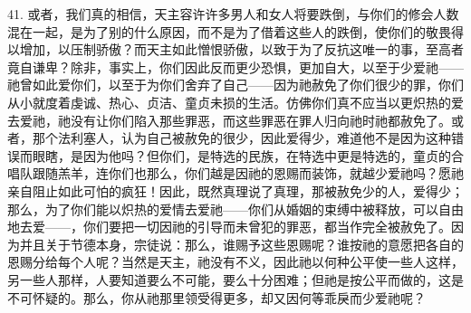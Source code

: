 41. 或者，我们真的相信，天主容许许多男人和女人将要跌倒，与你们的修会人数混在一起，是为了别的什么原因，而不是为了借着这些人的跌倒，使你们的敬畏得以增加，以压制骄傲？而天主如此憎恨骄傲，以致于为了反抗这唯一的事，至高者竟自谦卑？除非，事实上，你们因此反而更少恐惧，更加自大，以至于少爱祂——祂曾如此爱你们，以至于为你们舍弃了自己——因为祂赦免了你们很少的罪，你们从小就度着虔诚、热心、贞洁、童贞未损的生活。仿佛你们真不应当以更炽热的爱去爱祂，祂没有让你们陷入那些罪恶，而这些罪恶在罪人归向祂时祂都赦免了。或者，那个法利塞人，认为自己被赦免的很少，因此爱得少，难道他不是因为这种错误而眼瞎，是因为他吗？但你们，是特选的民族，在特选中更是特选的，童贞的合唱队跟随羔羊，连你们也那么，你们越是因祂的恩赐而装饰，就越少爱祂吗？愿祂亲自阻止如此可怕的疯狂！因此，既然真理说了真理，那被赦免少的人，爱得少；那么，为了你们能以炽热的爱情去爱祂——你们从婚姻的束缚中被释放，可以自由地去爱——，你们要把一切因祂的引导而未曾犯的罪恶，都当作完全被赦免了。因为并且关于节德本身，宗徒说：那么，谁赐予这些恩赐呢？谁按祂的意愿把各自的恩赐分给每个人呢？当然是天主，祂没有不义，因此祂以何种公平使一些人这样，另一些人那样，人要知道要么不可能，要么十分困难；但祂是按公平而做的，这是不可怀疑的。那么，你从祂那里领受得更多，却又因何等乖戾而少爱祂呢？\par

